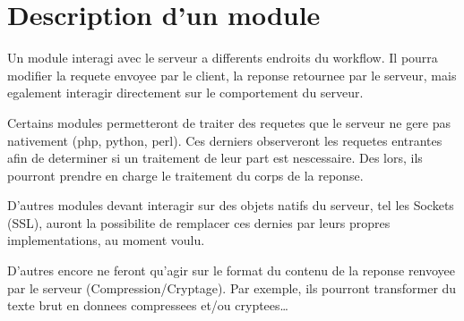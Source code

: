   \chapter{Description d'un module}

  Un module interagi avec le serveur a differents endroits du workflow.
  Il pourra modifier la requete envoyee par le client, la reponse retournee par le serveur, mais egalement
  interagir directement sur le comportement du serveur.

  Certains modules permetteront de traiter des requetes que le serveur ne gere pas nativement (php, python, perl).
  Ces derniers observeront les requetes entrantes afin de determiner si un traitement de leur part est nescessaire.
  Des lors, ils pourront prendre en charge le traitement du corps de la reponse.

  D'autres modules devant interagir sur des objets natifs du serveur, tel les Sockets (SSL), auront la possibilite de remplacer ces dernies par leurs propres implementations, au moment voulu.

  D'autres encore ne feront qu'agir sur le format du contenu de la reponse renvoyee par le serveur (Compression/Cryptage).
  Par exemple, ils pourront transformer du texte brut en donnees compressees et/ou cryptees\ldots
